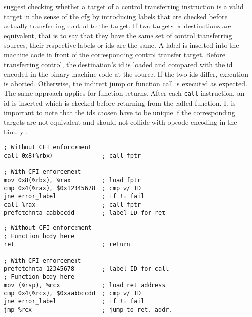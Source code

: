  suggest checking whether a target of a control transferring instruction is a valid target in the sense of the \gls{cfg} by introducing labels that are checked before actually transferring control to the target.
If two targets or destinations are equivalent, that is to say that they have the same set of control transferring sources, their respective labels or \glspl{id} are the same.
A label is inserted into the machine code in front of the corresponding control transfer target.
Before transferring control, the destination's \gls{id} is loaded and compared with the \gls{id} encoded in the binary machine code at the source.
If the two \glspl{id} differ, execution is aborted.
Otherwise, the indirect jump or function call is executed as expected.
The same approach applies for function returns.
After each \texttt{call} instruction, an \gls{id} is inserted which is checked before returning from the called function.
It is important to note that the \glspl{id} chosen have to be unique if the corresponding targets are not equivalent and should not collide with \gls{opcode} encoding in the binary \cite[343\psqq]{Abadi2005}.

\begin{lstlisting}[float=ht,caption={Function call without and with \acs{cfi} enforcement according to the implementation of {\citeauthor{Abadi2005}} (own code based on {\cite[343\psqq]{Abadi2005}})},label={lst:cfi-function-call}]
; Without CFI enforcement
call 0x8(%rbx)              ; call fptr

; With CFI enforcement
mov 0x8(%rbx), %rax         ; load fptr
cmp 0x4(%rax), $0x12345678  ; cmp w/ ID
jne error_label             ; if != fail
call %rax                   ; call fptr
prefetchnta aabbccdd        ; label ID for ret
\end{lstlisting}

\begin{lstlisting}[float=ht,caption={Return from function without and with \acs{cfi} enforcement according to the implementation of {\citeauthor{Abadi2005}} (own code based on {\cite[343\psqq]{Abadi2005}})},label={lst:cfi-function-return}]
; Without CFI enforcement
; Function body here
ret                         ; return

; With CFI enforcement
prefetchnta 12345678        ; label ID for call
; Function body here
mov (%rsp), %rcx            ; load ret address
cmp 0x4(%rcx), $0xaabbccdd  ; cmp w/ ID
jne error_label             ; if != fail
jmp %rcx                    ; jump to ret. addr.
\end{lstlisting}

